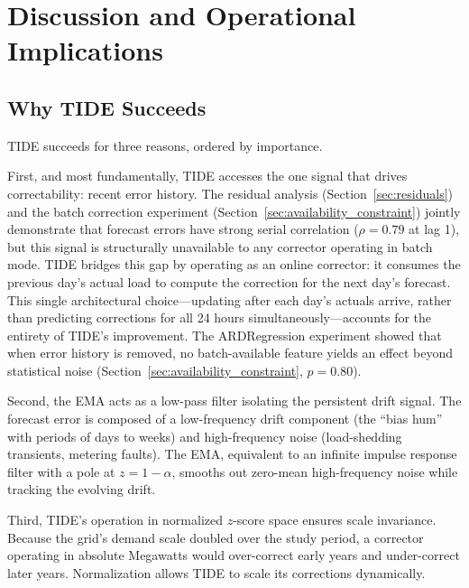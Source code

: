 \documentclass[11pt,letterpaper]{article}
\begin{document}
\section{Discussion and Operational Implications}
\label{sec:discussion}

\subsection{Why TIDE Succeeds}

TIDE succeeds for three reasons, ordered by importance.

First, and most fundamentally, TIDE accesses the one signal that drives correctability: recent error history. The residual analysis (Section~\ref{sec:residuals}) and the batch correction experiment (Section~\ref{sec:availability_constraint}) jointly demonstrate that forecast errors have strong serial correlation ($\rho = 0.79$ at lag 1), but this signal is structurally unavailable to any corrector operating in batch mode. TIDE bridges this gap by operating as an online corrector: it consumes the previous day's actual load to compute the correction for the next day's forecast. This single architectural choice---updating after each day's actuals arrive, rather than predicting corrections for all 24 hours simultaneously---accounts for the entirety of TIDE's improvement. The ARDRegression experiment showed that when error history is removed, no batch-available feature yields an effect beyond statistical noise (Section~\ref{sec:availability_constraint}, $p = 0.80$).

Second, the EMA acts as a low-pass filter isolating the persistent drift signal. The forecast error is composed of a low-frequency drift component (the ``bias hum'' with periods of days to weeks) and high-frequency noise (load-shedding transients, metering faults). The EMA, equivalent to an infinite impulse response filter with a pole at $z = 1 - \alpha$, smooths out zero-mean high-frequency noise while tracking the evolving drift.

Third, TIDE's operation in normalized $z$-score space ensures scale invariance. Because the grid's demand scale doubled over the study period, a corrector operating in absolute Megawatts would over-correct early years and under-correct later years. Normalization allows TIDE to scale its corrections dynamically.
\end{document}
